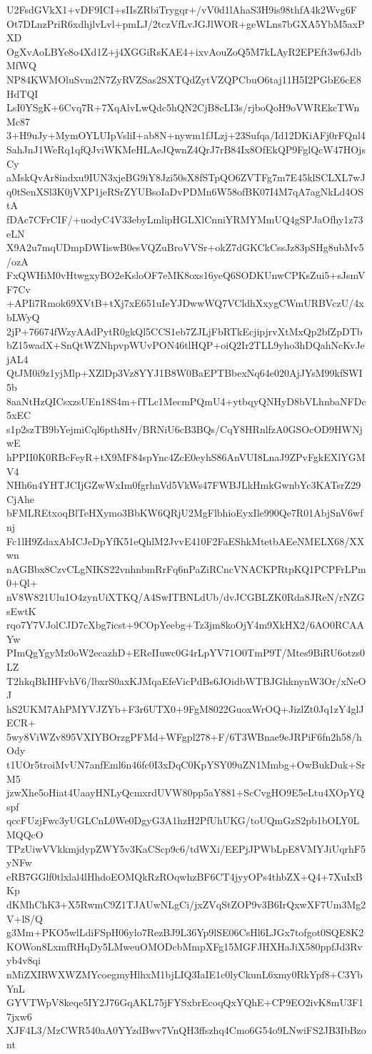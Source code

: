 U2FsdGVkX1+vDF9ICI+sIIsZRbiTrygqr+/vV0d1lAhaS3H9is98thfA4k2Wvg6F
Ot7DLnzPriR6xdhjlvLvl+pmLJ/2tczVfLvJGJlWOR+geWLns7bGXA5YbM5axPXD
OgXvAoLBYe8o4Xd1Z+j4XGGiRsKAE4+ixvAouZoQ5M7kLAyR2EPEft3w6JdbMfWQ
NP84KWMOluSvm2N7ZyRVZSas2SXTQdZytVZQPCbuO6taj11H5I2PGbE6cE8HdTQI
LsI0YSgK+6Cvq7R+7XqAlvLwQdc5hQN2CjB8cLI3s/rjboQoH9oVWREkcTWnMc87
3+H9uJy+MymOYLUIpVsliI+ab8N+nywm1fJLzj+23Sufqa/Id12DKiAFj0rFQnl4
SahJnJ1WeRq1qfQJviWKMeHLAeJQwnZ4QrJ7rB84Ix8OfEkQP9FglQcW47HOjsCy
aMskQvAr8indxu9IUN3xjeBG9iY8Jzi50sX8fSTpQO6ZVTFg7m7E45klSCLXL7wJ
q0tSenXSl3K0jVXP1jeRSrZYUBsoIaDvPDMn6W58ofBK07I4M7qA7agNkLd4OStA
fDAc7CFrCIF/+uodyC4V33ebyLmlipHGLXlCnniYRMYMmUQ4gSPJaOfhy1z73eLN
X9A2u7mqUDmpDWIiswB0esVQZuBroVVSr+okZ7dGKCkCssJz83pSHg8ubMv5/ozA
FxQWHiM0vHtwgxyBO2eKsloOF7eMK8oxs16yeQ6SODKUnwCPKsZui5+sJsmVF7Cv
+APIi7Rmok69XVtB+tXj7xE651uIeYJDwwWQ7VCldhXxygCWmURBVczU/4xbLWyQ
2jP+76674fWzyAAdPytR0gkQl5CCS1eb7ZJLjFbRTkEcjipjrvXtMxQp2bfZpDTb
bZ15wadX+SnQtWZNhpvpWUvPON46tlHQP+oiQ2Ir2TLL9yho3hDQahNcKvJejAL4
QtJM0i9z1yjMlp+XZlDp3Vz8YYJ1B8W0BaEPTBbexNq64e020AjJYsM99kfSWI5b
8aaNtHzQICsxzsUEn18S4m+fTLc1MecmPQmU4+ytbqyQNHyD8bVLhnbaNFDc5xEC
s1p2szTB9bYejmiCql6pth8Hv/BRNiU6cB3BQs/CqY8HRnlfzA0GSOcOD9HWNjwE
hPPII0K0RBcFeyR+tX9MF84spYnc4ZcE0eyhS86AnVUI8LnaJ9ZPvFgkEXlYGMV4
NHh6n4YHTJCIjGZwWxIm0fgrhnVd5VkWs47FWBJLkHmkGwnbYc3KATsrZ29CjAhe
bFMLREtxoqBlTeHXymo3BbKW6QRjU2MgFlbhioEyxIle990Qe7R01AbjSnV6wfnj
Fc1lH9ZdaxAbICJeDpYfK51eQhlM2JvvE410F2FaEShkMtetbAEeNMELX68/XXwn
nAGBbx8CzvCLgNIKS22vnhnbmRrFq6nPaZiRCncVNACKPRtpKQ1PCPFrLPm0+Ql+
nV8W821Ulu1O4zynUiXTKQ/A4SwITBNLdUb/dvJCGBLZK0Rda8JReN/rNZGsEwtK
rqo7Y7VJolCJD7cXbg7icst+9COpYeebg+Tz3jm8koOjY4m9XkHX2/6AO0RCAAYw
PImQgYgyMz0oW2ecazhD+EReIIuwc0G4rLpYV71O0TmP9T/Mtes9BiRU6otzs0LZ
T2hkqBkIHFvhV6/lbxrS0axKJMqaEfeVicPdBs6JOidbWTBJGhknynW3Or/xNeOJ
hS2UKM7AhPMYVJZYb+F3r6UTX0+9FgM8022GuoxWrOQ+JizlZt0Jq1zY4glJECR+
5wy8ViWZv895VXIYBOrzgPFMd+WFgpl278+F/6T3WBnae9eJRPiF6fn2h58/hOdy
t1UOr5troiMvUN7anfEml6n46fc0I3xDqC0KpYSY09uZN1Mmbg+OwBukDuk+SrM5
jzwXhe5oHiat4UaayHNLyQcmxrdUVW80pp5aY881+ScCvgHO9E5eLtu4XOpYQspf
qccFUzjFwc3yUGLCnL0We0DgyG3A1hzH2PfUhUKG/toUQmGzS2pb1bOLY0LMQQcO
TPzUiwVVkkmjdypZWY5v3KaCScp9c6/tdWXi/EEPjJPWbLpE8VMYJiUqrhF5yNFw
eRB7GGlf0tlxlal4lHhdoEOMQkRzROqwhzBF6CT4jyyOPs4thbZX+Q4+7XuIxBKp
dKMhChK3+X5RwmC9Z1TJAUwNLgCi/jxZVqStZOP9v3B6IrQxwXF7Um3Mg2V+lS/Q
g3Mm+PKO5wlLdiFSpH06ylo7RezBJ9L36Yp9lSE06CsHl6LJGx7tofgot0SQE8K2
KOWon8LxmfRHqDy5LMweuOMODcbMmpXFg15MGFJHXHaJiX580ppfJd3Rvyb4v8qi
nMiZXIRWXWZMYcoegmyHlhxM1bjLIQ3IaIE1c0lyCkunL6xmy0RkYpf8+C3YbYnL
GYVTWpV8keqe5IY2J76GqAKL75jFYSxbrEcoqQxYQhE+CP9EO2ivK8mU3F17jxw6
XJF4L3/MzCWR540aA0YYzdBwv7VnQH3ffszhq4Cmo6G54o9LNwiFS2JB3IbBzont
